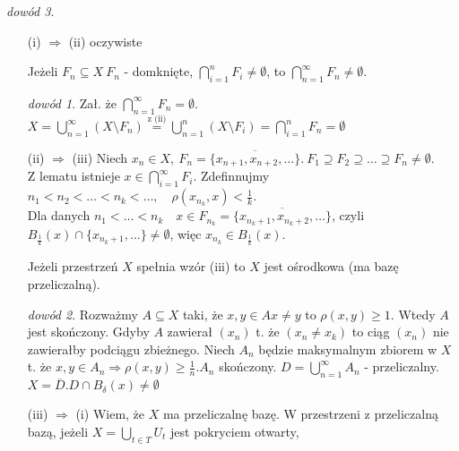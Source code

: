 \documentclass[twoside,10pt]{article}
\theoremstyle{definition}
\theoremstyle{definition}
\theoremstyle{definition}
\theoremstyle{definition}
\theoremstyle{remark}
\newtheorem*{dd}{dowód}
\theoremstyle{definition}
\theoremstyle{definition}
\theoremstyle{definition}
\theoremstyle{definition}
\theoremstyle{definition}
\theoremstyle{definition}
\begin{document}
\begin{dd} \hfill
    \begin{itemize}
        \item[(i) $\Rightarrow$ (ii)] oczywiste
        \begin{lem}
            Jeżeli $F_n \subseteq X \ F_n$ - domknięte, $\bigcap\limits_{i=1}^n F_i \neq \emptyset$, to $\bigcap\limits_{n=1}^\infty F_n \neq \emptyset$.
            \begin{dd} 
                Zał. że $\bigcap\limits_{n=1}^\infty F_n = \emptyset$. \\ 
                $ X = \bigcup\limits_{n=1}^\infty (X \setminus F_n) \overset{\text{z (ii)}}{=} \bigcup\limits_{n=1}^n(X \setminus F_i) = \bigcap\limits_{i=1}^n F_n = \emptyset$ \lightning
            \end{dd}
        \end{lem} 
        \item[(ii) $\Rightarrow$ (iii)] 
            Niech $x_n \in X, \ F_n = \overline{\{x_{n+1},x_{n+2},\ldots\}}. \ F_1 \supseteq F_2 \supseteq \ldots \supseteq F_n \neq \emptyset$.\\
            Z lematu istnieje $x \in \bigcap\limits_{i=1}^\infty F_i$. Zdefinnujmy $n_1 < n_2 < \ldots < n_k < \ldots, \quad \rho(x_{n_k},x) < \frac{1}{k}$. \\
            Dla danych $n_1 < \ldots < n_k \quad x \in F_{n_k} = \overline{\{x_{n_k+1},x_{n_k+2},\ldots\}}$, czyli $B_{\frac{1}{k}}(x) \cap \{x_{n_k+1},\ldots\} \neq \emptyset$, 
            więc $x_{n_k} \in B_{\frac{1}{k}}(x)$.
        \begin{lem} 
            Jeżeli przestrzeń $X$ spełnia wzór (iii) to $X$ jest ośrodkowa (ma bazę przeliczalną).
            \begin{dd} 
                Rozważmy $A \subseteq X$ taki, że $x,y \in A x \neq y$ to $\rho(x,y) \ge 1$. Wtedy $A$ jest skończony. Gdyby $A$ 
                zawierał $(x_n)$ t. że $(x_n \neq x_k)$ to ciąg $(x_n)$ nie zawierałby podciągu zbieżnego.
                Niech $A_n$ będzie maksymalnym zbiorem w $X$ t. że $x,y \in A_n \Rightarrow \rho(x,y) \ge \frac{1}{n}. A_n$ skończony. 
                $D = \bigcup\limits_{n=1}^\infty A_n$ - przeliczalny. $X = \overline{D}. D \cap B_\delta(x) \neq \emptyset$
            \end{dd} 
        \end{lem}
        \item[(iii) $\Rightarrow$ (i)] Wiem, że $X$ ma przeliczalnę bazę. W przestrzeni z przeliczalną bazą, jeżeli $X = \bigcup\limits_{t \in T}U_t$ jest pokryciem otwarty, 

\end{itemize}
\end{dd}
\end{document}
